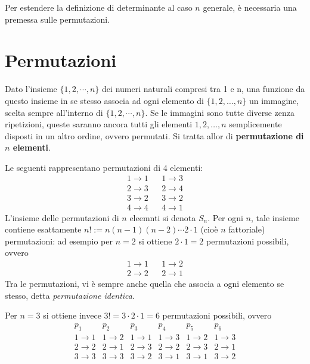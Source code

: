 Per estendere la definizione di determinante al caso $n$ generale, è necessaria una
premessa sulle permutazioni.

\section{Permutazioni}
\label{sec:perm}

Dato l'insieme $\{1,2,\cdots, n\}$ dei numeri naturali compresi tra 1 e n, una
funzione da questo insieme in se stesso associa ad ogni elemento di $\{1,2,\dots,n\}$
un immagine, scelta sempre all'interno di $\{1,2,\cdots,n\}$. Se le immagini sono
tutte diverse zenza ripetizioni, queste saranno ancora tutti gli elementi
$1,2,\dots,n$ semplicemente disposti in un altro ordine, ovvero permutati. Si tratta
allor di \textbf{permutazione di $n$ elementi}.
\begin{es}
  \label{es:perm1}
  Le seguenti rappresentano permutazioni di 4 elementi:
  \begin{eqnarray*}
    1 \to 1 && 1 \to 3\\
    2 \to 3 && 2 \to 4\\
    3 \to 2 && 3 \to 2\\
    4 \to 4 && 4 \to 1
  \end{eqnarray*}
  L'insieme delle permutazioni di $n$ eleemnti si denota $S_n$. Per ogni $n$, tale
  insieme contiene esattamente $n!:= n(n-1)(n-2)\cdots 2 \cdot 1$ (cioè $n$
  fattoriale) permutazioni: ad esempio per $n=2$ si ottiene $2\cdot 1=2$ permutazioni
  possibili, ovvero
  \begin{equation*}
    \begin{matrix}
      1\to 1 && 1\to 2\\
      2\to 2 && 2\to 1
    \end{matrix}
  \end{equation*}
  Tra le permutazioni, vi è sempre anche quella che associa a ogni elemento se stesso,
  detta \textit{permutazione identica}.
\end{es}
Per $n=3$ si ottiene invece $3! = 3\cdot 2\cdot 1 = 6$ permutazioni possibili,
ovvero
\begin{equation*}
  \begin{matrix}
    p_1 & p_2 & p_3 & p_4 & p_5 & p_6\\
    1 \to 1 & 1 \to 2 & 1 \to 1 & 1 \to 3 & 1 \to 2 & 1 \to 3 \\
    2 \to 2 & 2 \to 1 & 2 \to 3 & 2 \to 2 & 2 \to 3 & 2 \to 1 \\
    3 \to 3 & 3 \to 3 & 3 \to 2 & 3 \to 1 & 3 \to 1 & 3 \to 2
  \end{matrix}
\end{equation*}
